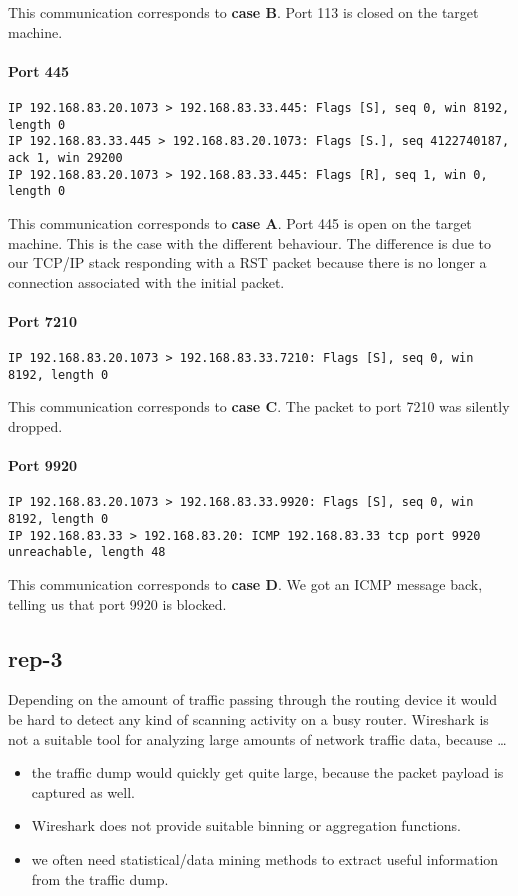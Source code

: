 \documentclass{article}
\begin{document}
This communication corresponds to \textbf{case B}. Port 113 is closed on the target machine.

\paragraph{Port 445}

\begin{Verbatim}
IP 192.168.83.20.1073 > 192.168.83.33.445: Flags [S], seq 0, win 8192, length 0
IP 192.168.83.33.445 > 192.168.83.20.1073: Flags [S.], seq 4122740187, ack 1, win 29200
IP 192.168.83.20.1073 > 192.168.83.33.445: Flags [R], seq 1, win 0, length 0
\end{Verbatim}

This communication corresponds to \textbf{case A}. Port 445 is open on the target machine. This
is the case with the different behaviour. The difference is due to our TCP/IP stack responding with
a RST packet because there is no longer a connection associated with the initial packet.

\paragraph{Port 7210}
\begin{Verbatim}
IP 192.168.83.20.1073 > 192.168.83.33.7210: Flags [S], seq 0, win 8192, length 0
\end{Verbatim}

This communication corresponds to \textbf{case C}. The packet to port 7210 was silently dropped.

\paragraph{Port 9920}
\begin{Verbatim}
IP 192.168.83.20.1073 > 192.168.83.33.9920: Flags [S], seq 0, win 8192, length 0
IP 192.168.83.33 > 192.168.83.20: ICMP 192.168.83.33 tcp port 9920 unreachable, length 48
\end{Verbatim}

This communication corresponds to \textbf{case D}. We got an ICMP message back, telling us that port 9920
is blocked.

\subsection{rep-3}

Depending on the amount of traffic passing through the routing device it would be hard to
detect any kind of scanning activity on a busy router. Wireshark is not a suitable tool for analyzing
large amounts of network traffic data, because \ldots
\begin{itemize}
    \item the traffic dump would quickly get quite large, because the packet payload is captured as well.
    \item Wireshark does not provide suitable binning or aggregation functions.
    \item we often need statistical/data mining methods to extract useful information from the traffic dump.
\end{itemize}
\end{document}
